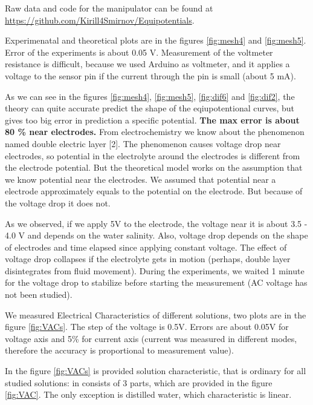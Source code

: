 \documentclass{article}
\begin{document}
Raw data and code for the manipulator can be found at \url{https://github.com/Kirill4Smirnov/Equipotentials}. \par

Experimenatal and theoretical plots are in the figures \ref{fig:mesh4} and \ref{fig:mesh5}. Error of the experiments is about 0.05 V. Measurement of the voltmeter resistance is difficult, because we used Arduino as voltmeter, and it applies a voltage to the sensor pin if the current through the pin is small (about 5 mA). \par

As we can see in the figures \ref{fig:mesh4}, \ref{fig:mesh5}, \ref{fig:dif6} and \ref{fig:dif2}, the theory can quite accurate predict the shape of the eqiupotentional curves, but gives too big error in prediction a specific potential. \textbf{The max error is about 80 \% near electrodes.} From electrochemistry we know about the phenomenon named double electric layer [2]. The phenomenon causes voltage drop near electrodes, so potential in the electrolyte around the electrodes is different from the electrode potential. But the theoretical model works on the assumption that we know potential near the electrodes. We assumed that potential near a electrode approximately equals to the potential on the electrode. But because of the voltage drop it does not. \par

As we observed, if we apply 5V to the electrode, the voltage near it is about 3.5 - 4.0 V and depends on the water salinity. Also, voltage drop depends on the shape of electrodes and time elapsed since applying constant voltage. The effect of voltage drop collapses if the electrolyte gets in motion (perhaps, double layer disintegrates from fluid movement). During the experiments, we waited 1 minute for the voltage drop to stabilize before starting the measurement (AC voltage has not been studied).\par

We measured Electrical Characteristics of different solutions, two plots are in the figure \ref{fig:VACs}. The step of the voltage is 0.5V. Errors are about 0.05V for voltage axis and 5\% for current axis (current was measured in different modes, therefore the accuracy is proportional to measurement value).


In the figure \ref{fig:VACs} is provided solution characteristic, that is ordinary for all studied solutions: in consists of 3 parts, which are provided in the figure \ref{fig:VAC}. The only exception is distilled water, which characteristic is linear.
\end{document}
